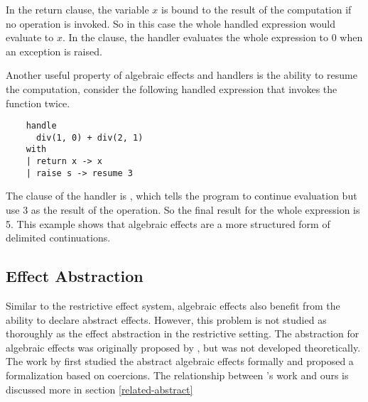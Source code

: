 In the return clause, the variable $x$ is bound to the result of the computation if no operation is invoked. So in this case the whole handled expression would evaluate to $x$. In the  clause, the handler evaluates the whole expression to 0 when an exception is raised. 

Another useful property of algebraic effects and handlers is the ability to resume the computation, consider the following handled expression that invokes the function  twice.

\begin{verbatim}
	handle 
	  div(1, 0) + div(2, 1)
	with 
	| return x -> x
	| raise s -> resume 3
\end{verbatim}

The  clause of the handler is  , which tells the program to continue evaluation but use 3 as the result of the operation. So the final result for the whole expression is 5. This example shows that algebraic effects are a more structured form of delimited continuations. 

\subsection{Effect Abstraction}
Similar to the restrictive effect system, algebraic effects also benefit from the ability to declare abstract effects. However, this problem is not studied as thoroughly as the effect abstraction in the restrictive setting. The abstraction for algebraic effects was originally proposed by \citet{leijen18}, but was not developed theoretically. The work by \citet{biernacki19} first studied the abstract algebraic effects formally and proposed a formalization based on coercions. The relationship between \citet{biernacki19}'s work and ours is discussed more in section \ref{related-abstract}








